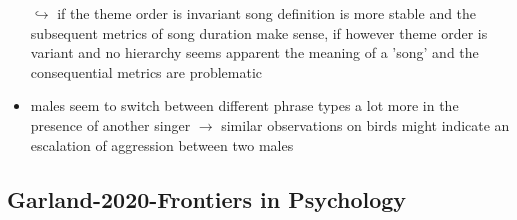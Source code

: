 \documentclass[12pt,a4paper]{article}
\begin{document}
\begin{itemize}
  \newline \indent $\hookrightarrow$  if the theme order is invariant song definition is more stable and the subsequent metrics of song duration make sense, if however theme order is variant and no hierarchy seems apparent the meaning of a 'song' and the consequential metrics are problematic
  \item males seem to switch between different phrase types a lot more in the presence of another singer
  \newline \indent $\longrightarrow$ similar observations on birds might indicate an escalation of aggression between two males
\end{itemize}

\newpage
\subsection{Garland-2020-Frontiers in Psychology} %
\label{sub:garland_2020_frontiers_in_psychology}
\end{document}
